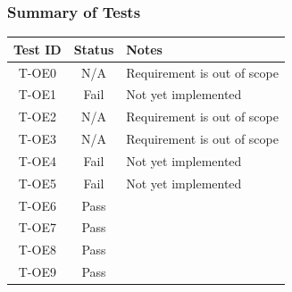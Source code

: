 \documentclass[12pt, titlepage]{article}
\begin{document}
\subsubsection{Summary of Tests}
\begin{center}
    \begin{tabular}{|c|c|l|}
        \hline
        \textbf{Test ID} & \textbf{Status} & \textbf{Notes}\\
        \hline
        T-OE0 & N/A & Requirement is out of scope\\
        T-OE1 & Fail & Not yet implemented\\
        T-OE2 & N/A & Requirement is out of scope \\
        T-OE3 & N/A & Requirement is out of scope \\
        T-OE4 & Fail & Not yet implemented \\
        T-OE5 & Fail & Not yet implemented \\
        T-OE6 & Pass & \\
        T-OE7 & Pass & \\
        T-OE8 & Pass & \\
        T-OE9 & Pass & \\
        \hline
    \end{tabular}
\end{center}
\end{document}
